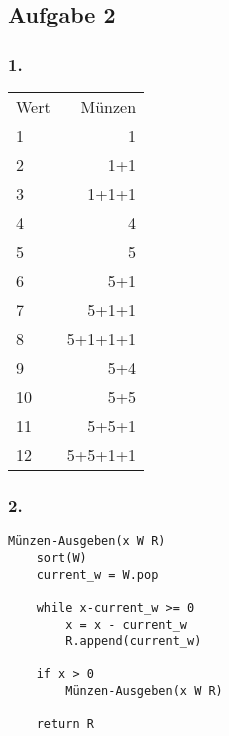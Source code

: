 \documentclass[a4paper,fleqn]{scrartcl}
\begin{document}
\subsection*{Aufgabe 2}
\subsubsection*{1.}
\begin{tabular}{l r}
Wert & Münzen \\
1 & 1 \\
2 & 1+1 \\
3 & 1+1+1 \\
4 & 4 \\
5 & 5 \\
6 & 5+1 \\
7 & 5+1+1 \\
8 & 5+1+1+1 \\
9 & 5+4 \\
10 & 5+5 \\
11 & 5+5+1 \\
12 & 5+5+1+1 \\
\end{tabular}

\subsubsection*{2.}
\begin{verbatim}
Münzen-Ausgeben(x W R)
    sort(W)
    current_w = W.pop
    
    while x-current_w >= 0
        x = x - current_w
        R.append(current_w)
    
    if x > 0
        Münzen-Ausgeben(x W R)
    
    return R                                                                                           
\end{verbatim}
\end{document}
